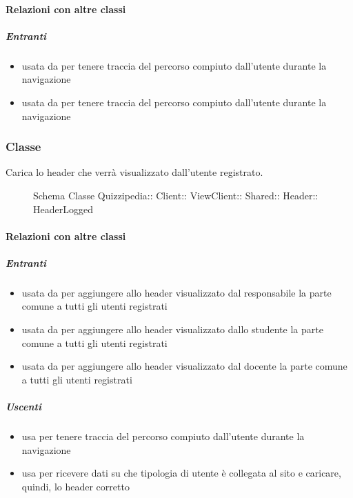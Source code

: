 \paragraph{Relazioni con altre classi}
\subparagraph{Entranti}
\begin{itemize}
\item usata da  per tenere traccia del percorso compiuto dall'utente durante la navigazione
\item usata da  per tenere traccia del percorso compiuto dall'utente durante la navigazione
\end{itemize}
\subsubsection{Classe }
Carica lo header che verrà visualizzato dall'utente registrato.
\begin{figure}[H]
\centering
\noindent{}
\caption[Schema Classe HeaderLogged]{Schema Classe Quizzipedia:: Client:: ViewClient:: Shared:: Header:: HeaderLogged}
\end{figure}
\paragraph{Relazioni con altre classi}
\subparagraph{Entranti}
\begin{itemize}
\item usata da  per aggiungere allo header visualizzato dal responsabile la parte comune a tutti gli utenti registrati
\item usata da  per aggiungere allo header visualizzato dallo studente la parte comune a tutti gli utenti registrati
\item usata da  per aggiungere allo header visualizzato dal docente la parte comune a tutti gli utenti registrati
\end{itemize}
\subparagraph{Uscenti}
\begin{itemize}
\item usa  per tenere traccia del percorso compiuto dall'utente durante la navigazione
\item usa  per ricevere dati su che tipologia di utente è collegata al sito e caricare, quindi, lo header corretto
\end{itemize}
